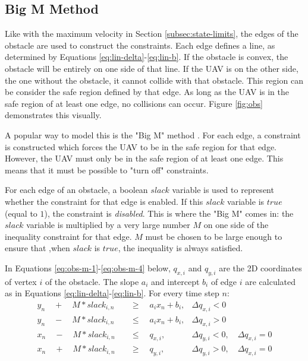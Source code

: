 \subsection{Big M Method}
Like with the maximum velocity in Section \ref{subsec:state-limits}, the edges of the obstacle are used to construct the constraints. Each edge defines a line, as determined by Equations \ref{eq:lin-delta}-\ref{eq:lin-b}. If the obstacle is convex, the obstacle will be entirely on one side of that line. If the UAV is on the other side, the one without the obstacle, it cannot collide with that obstacle. This region can be consider the safe region defined by that edge. As long as the UAV is in the safe region of at least one edge, no collisions can occur. Figure \ref{fig:obs} demonstrates this visually.
\par
A popular way to model this is the "Big M" method \cite{Schouwenaars2001}. For each edge, a constraint is constructed which forces the UAV to be in the safe region for that edge. However, the UAV must only be in the safe region of at least one edge. This means that it must be possible to "turn off" constraints.
\par
For each edge of an obstacle, a boolean $slack$ variable is used to represent whether the constraint for that edge is enabled. If this $slack$ variable is $true$ (equal to $1$), the constraint is \emph{disabled}. This is where the "Big M" comes in: the $slack$ variable is multiplied by a very large number $M$ on one side of the inequality constraint for that edge. $M$ must be chosen to be large enough to ensure that ,when $slack$ is $true$, the inequality is always satisfied.
\par
In Equations \ref{eq:obs-m-1}-\ref{eq:obs-m-4} below, $q_{x,i}$ and $q_{y,i}$ are the 2D coordinates of vertex $i$ of the obstacle. The slope $a_{i}$ and intercept $b_{i}$ of edge $i$ are calculated as in Equations \ref{eq:lin-delta}-\ref{eq:lin-b}. For every time step $n$:
\\
\begin{align}
y_{n} \quad + \quad M*slack_{i,n} \quad &\geq 
\quad a_{i} x_{n} + b_{i},  	
& \Delta q_{x,i} < 0 							 	
\label{eq:obs-m-1} \\
y_{n} \quad - \quad M*slack_{i,n} \quad &\leq 
\quad a_{i} x_{n} + b_{i},
& \Delta q_{x,i} > 0 							 	
\label{eq:obs-m-2} \\
x_{n} \quad - \quad M*slack_{i,n} \quad &\leq
\quad  q_{x,i}, 		
& \Delta q_{y,i} < 0, \quad \Delta q_{x,i} = 0 	
\label{eq:obs-m-3} \\
x_{n} \quad + \quad M*slack_{i,n} \quad &\geq 
\quad q_{y,i},  		
& \Delta q_{y,i} > 0, \quad \Delta q_{x,i} = 0 	
\label{eq:obs-m-4}
\end{align}
